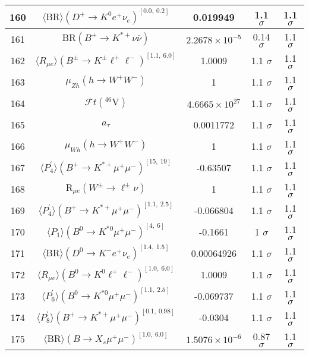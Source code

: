\begin{longtable}{|c|c|c|c|c|}
160 &	 $\langle\mathrm{BR}\rangle(D^+\to K^0e^+\nu_e)^{[0.0,\  0.2]}$ &	 0.019949 &	 \cellcolor{red!0}1.1 $ \sigma$ &	 1.1 $ \sigma$ \\ \hline
161 &	 $\mathrm{BR}(B^+\to K^{*+}\nu\bar\nu)$ &	 $2.2678\times 10^{-5}$ &	 \cellcolor{green!50}0.14 $ \sigma$ &	 1.1 $ \sigma$ \\ \hline
162 &	 $\langle R_{\mu e} \rangle(B^\pm\to K^\pm \ell^+\ell^-)^{[1.1,\  6.0]}$ &	 1.0009 &	 \cellcolor{red!0}1.1 $ \sigma$ &	 1.1 $ \sigma$ \\ \hline
163 &	 $\mu_{Zh}(h \to W^+W^-)$ &	 1 &	 \cellcolor{green!0}1.1 $ \sigma$ &	 1.1 $ \sigma$ \\ \hline
164 &	 $\mathcal{F}t({}^{46}\mathrm{V})$ &	 $4.6665\times 10^{27}$ &	 \cellcolor{red!0}1.1 $ \sigma$ &	 1.1 $ \sigma$ \\ \hline
165 &	 $a_\tau$ &	 0.0011772 &	 1.1 $ \sigma$ &	 1.1 $ \sigma$ \\ \hline
166 &	 $\mu_{Wh}(h \to W^+W^-)$ &	 1 &	 \cellcolor{green!0}1.1 $ \sigma$ &	 1.1 $ \sigma$ \\ \hline
167 &	 $\langle P_4^\prime\rangle(B^+\to K^{\ast +}\mu^+\mu^-)^{[15,\  19]}$ &	 -0.63507 &	 \cellcolor{green!0}1.1 $ \sigma$ &	 1.1 $ \sigma$ \\ \hline
168 &	 $\mathrm{R}_{\mu  e}(W^\pm\to \ell^\pm\nu)$ &	 1 &	 1.1 $ \sigma$ &	 1.1 $ \sigma$ \\ \hline
169 &	 $\langle P_4^\prime\rangle(B^+\to K^{\ast +}\mu^+\mu^-)^{[1.1,\  2.5]}$ &	 -0.066804 &	 \cellcolor{red!0}1.1 $ \sigma$ &	 1.1 $ \sigma$ \\ \hline
170 &	 $\langle P_1\rangle(B^0\to K^{\ast 0}\mu^+\mu^-)^{[4,\  6]}$ &	 -0.1661 &	 \cellcolor{green!2}1 $ \sigma$ &	 1.1 $ \sigma$ \\ \hline
171 &	 $\langle\mathrm{BR}\rangle(D^0\to K^- e^+\nu_e)^{[1.4,\  1.5]}$ &	 0.00064926 &	 \cellcolor{green!0}1.1 $ \sigma$ &	 1.1 $ \sigma$ \\ \hline
172 &	 $\langle R_{\mu e} \rangle(B^0\to K^0\ell^+\ell^-)^{[1.0,\  6.0]}$ &	 1.0009 &	 \cellcolor{red!0}1.1 $ \sigma$ &	 1.1 $ \sigma$ \\ \hline
173 &	 $\langle P_6^\prime\rangle(B^0\to K^{\ast 0}\mu^+\mu^-)^{[1.1,\  2.5]}$ &	 -0.069737 &	 \cellcolor{green!0}1.1 $ \sigma$ &	 1.1 $ \sigma$ \\ \hline
174 &	 $\langle P_8^\prime\rangle(B^+\to K^{\ast +}\mu^+\mu^-)^{[0.1,\  0.98]}$ &	 -0.0304 &	 \cellcolor{green!0}1.1 $ \sigma$ &	 1.1 $ \sigma$ \\ \hline
175 &	 $\langle \mathrm{BR} \rangle(B\to X_s\mu^+\mu^-)^{[1.0,\  6.0]}$ &	 $1.5076\times 10^{-6}$ &	 \cellcolor{green!9}0.87 $ \sigma$ &	 1.1 $ \sigma$ \\ \hline

\end{longtable}
